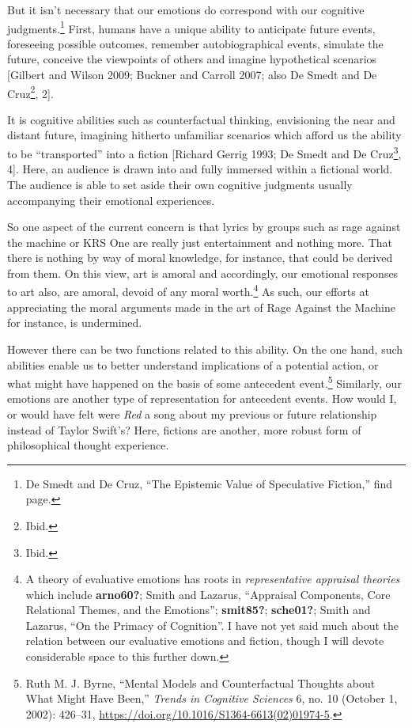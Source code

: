 \documentclass[
  12pt,
]{book}
\theoremstyle{definition}
\theoremstyle{definition}
\theoremstyle{definition}
\theoremstyle{definition}
\theoremstyle{remark}
\begin{document}
But it isn't necessary that our emotions do correspond with our cognitive judgments.\footnote{De Smedt and De Cruz, {``The Epistemic Value of Speculative Fiction,''} find page.} First, humans have a unique ability to anticipate future events, foreseeing possible outcomes, remember autobiographical events, simulate the future, conceive the viewpoints of others and imagine hypothetical scenarios {[}Gilbert and Wilson 2009; Buckner and Carroll 2007; also De Smedt and De Cruz\footnote{Ibid.}, 2{]}.

It is cognitive abilities such as counterfactual thinking, envisioning the near and distant future, imagining hitherto unfamiliar scenarios which afford us the ability to be ``transported'' into a fiction {[}Richard Gerrig 1993; De Smedt and De Cruz\footnote{Ibid.}, 4{]}. Here, an audience is drawn into and fully immersed within a fictional world. The audience is able to set aside their own cognitive judgments usually accompanying their emotional experiences.

So one aspect of the current concern is that lyrics by groups such as rage against the machine or KRS One are really just entertainment and nothing more. That there is nothing by way of moral knowledge, for instance, that could be derived from them. On this view, art is amoral and accordingly, our emotional responses to art also, are amoral, devoid of any moral worth.\footnote{A theory of evaluative emotions has roots in \emph{representative appraisal theories} which include \textbf{arno60?}; Smith and Lazarus, {``Appraisal {Components}, {Core Relational Themes}, and the {Emotions}''}; \textbf{smit85?}; \textbf{sche01?}; Smith and Lazarus, {``On the {Primacy} of {Cognition}''}. I have not yet said much about the relation between our evaluative emotions and fiction, though I will devote considerable space to this further down.} As such, our efforts at appreciating the moral arguments made in the art of Rage Against the Machine for instance, is undermined.

However there can be two functions related to this ability. On the one hand, such abilities enable us to better understand implications of a potential action, or what might have happened on the basis of some antecedent event.\footnote{Ruth M. J. Byrne, {``Mental Models and Counterfactual Thoughts about What Might Have Been,''} \emph{Trends in Cognitive Sciences} 6, no. 10 (October 1, 2002): 426--31, \url{https://doi.org/10.1016/S1364-6613(02)01974-5}.} Similarly, our emotions are another type of representation for antecedent events. How would I, or would have felt were \emph{Red} a song about my previous or future relationship instead of Taylor Swift's? Here, fictions are another, more robust form of philosophical thought experience.
\end{document}
